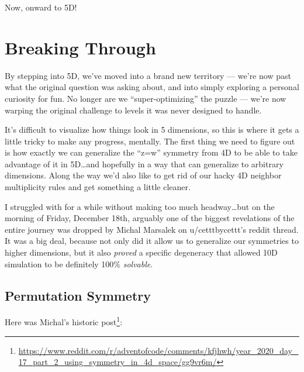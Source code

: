 \documentclass[]{article}
\renewcommand{\href}[2]{#2\footnote{\url{#1}}}
\begin{document}
Now, onward to 5D!

\hypertarget{breaking-through}{%
\section{Breaking Through}\label{breaking-through}}

By stepping into 5D, we've moved into a brand new territory --- we're now past
what the original question was asking about, and into simply exploring a
personal curiosity for fun. No longer are we ``super-optimizing'' the puzzle ---
we're now warping the original challenge to levels it was never designed to
handle.

It's difficult to visualize how things look in 5 dimensions, so this is where it
gets a little tricky to make any progress, mentally. The first thing we need to
figure out is how exactly we can generalize the ``z=w'' symmetry from 4D to be
able to take advantage of it in 5D\ldots and hopefully in a way that can
generalize to arbitrary dimensions. Along the way we'd also like to get rid of
our hacky 4D neighbor multiplicity rules and get something a little cleaner.

I struggled with for a while without making too much headway\ldots but on the
morning of Friday, December 18th, arguably one of the biggest revelations of the
entire journey was dropped by Michal Marsalek on u/cetttbycettt's reddit thread.
It was a big deal, because not only did it allow us to generalize our symmetries
to higher dimensions, but it also \emph{proved} a specific degeneracy that
allowed 10D simulation to be definitely 100\% \emph{solvable}.

\hypertarget{permutation-symmetry}{%
\subsection{Permutation Symmetry}\label{permutation-symmetry}}

Here was Michal's
\href{https://www.reddit.com/r/adventofcode/comments/kfjhwh/year_2020_day_17_part_2_using_symmetry_in_4d_space/gg9vr6m/}{historic
post}:
\end{document}
